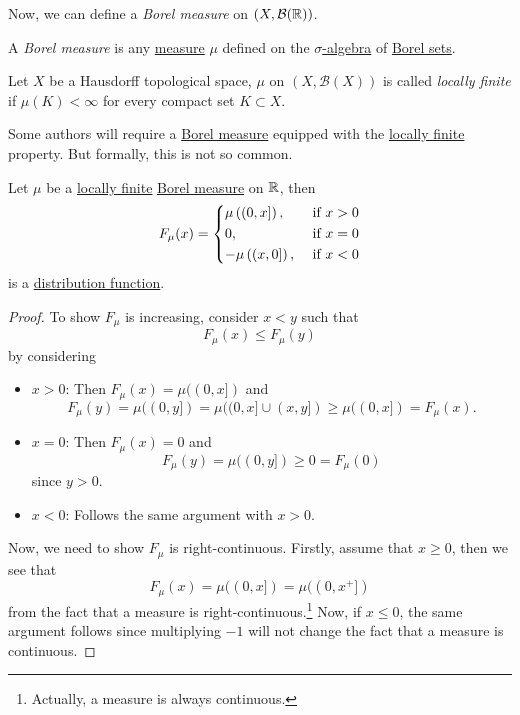 \hr

Now, we can define a \emph{Borel measure} on \((X, \mathcal{\MakeUppercase{B}} (\mathbb{\MakeUppercase{r}} ))\).
\begin{definition}\label{def:Borel-measure}
	A \emph{Borel measure} is any \hyperref[def:measure]{measure} \(\mu\) defined on the \hyperref[def:sigma-algebra]{\(\sigma\)-algebra} of \hyperref[def:Borel-set]{Borel sets}.
\end{definition}

\begin{definition}\label{def:locally-finite}
	Let \(X\) be a Hausdorff topological space, \(\mu\) on \((X, \mathcal{B} (X))\) is called \emph{locally finite} if \(\mu (K)<\infty \)
	for every compact set \(K\subset X\).
\end{definition}

\begin{note}
	Some authors will require a \hyperref[def:Borel-measure]{Borel measure} equipped with the \hyperref[def:locally-finite]{locally finite} property.
	But formally, this is not so common.
\end{note}

\begin{lemma}
	Let \(\mu \) be a \hyperref[def:locally-finite]{locally finite} \hyperref[def:Borel-measure]{Borel measure} on
	\(\mathbb{\MakeUppercase{R}} \), then
	\[
		F_{\mu }(x) = \begin{dcases}
			\mu \left((0, x]\right),  & \text{ if } x > 0 \\
			0,                        & \text{ if } x = 0 \\
			-\mu \left((x, 0]\right), & \text{ if } x < 0
		\end{dcases}
	\]
	is a \hyperref[def:distribution-function]{distribution function}.
\end{lemma}
\begin{proof}
	To show \(F_\mu\) is increasing, consider \(x<y\) such that
	\[
		F_\mu (x) \leq F_\mu (y)
	\]
	by considering
	\begin{itemize}
		\item \(x>0\): Then \(F_\mu (x) = \mu ((0, x])\) and
		      \[
			      F_\mu (y) = \mu ((0, y]) = \mu ((0, x]\cup (x, y]) \geq \mu ((0, x]) = F_\mu (x).
		      \]
		\item \(x=0\): Then \(F_\mu (x) = 0\) and
		      \[
			      F_\mu (y) = \mu ((0, y])\geq 0 = F_\mu (0)
		      \]
		      since \(y>0\).
		\item \(x<0\): Follows the same argument with \(x>0\).
	\end{itemize}

	\par Now, we need to show \(F_\mu \) is right-continuous. Firstly, assume that \(x \geq 0\), then we see that
	\[
		F_\mu(x) = \mu ((0, x]) = \mu ((0, x^+])
	\]
	from the fact that a measure is right-continuous.\footnote{Actually, a measure is always continuous.} Now, if \(x\leq 0\),
	the same argument follows since multiplying \(-1\) will not change the fact that a measure is continuous.
\end{proof}

